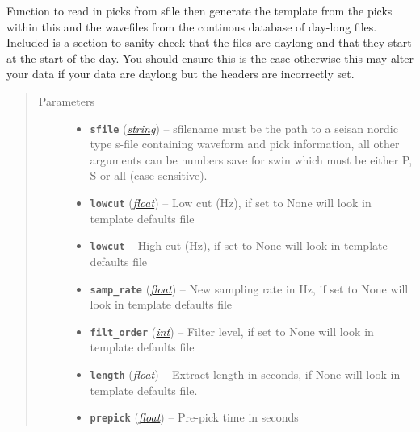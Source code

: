 \documentclass[a4paper,10pt,english]{sphinxmanual}
\begin{document}

\begin{fulllineitems}
\label{core:template_gen.from_contbase}
Function to read in picks from sfile then generate the template from the
picks within this and the wavefiles from the continous database of day-long
files.  Included is a section to sanity check that the files are daylong and
that they start at the start of the day.  You should ensure this is the case
otherwise this may alter your data if your data are daylong but the headers
are incorrectly set.
\begin{quote}\begin{description}
\item[{Parameters}] \leavevmode\begin{itemize}
\item {} 
\textbf{\texttt{sfile}} (\href{https://docs.python.org/library/string.html\#module-string}{\emph{string}}) -- sfilename must be the path to a seisan nordic type s-file             containing waveform and pick information, all other arguments can             be numbers save for swin which must be either P, S or all             (case-sensitive).

\item {} 
\textbf{\texttt{lowcut}} (\href{https://docs.python.org/library/functions.html\#float}{\emph{float}}) -- Low cut (Hz), if set to None will look in template            defaults file

\item {} 
\textbf{\texttt{lowcut}} -- High cut (Hz), if set to None will look in template            defaults file

\item {} 
\textbf{\texttt{samp\_rate}} (\href{https://docs.python.org/library/functions.html\#float}{\emph{float}}) -- New sampling rate in Hz, if set to None will look in            template defaults file

\item {} 
\textbf{\texttt{filt\_order}} (\href{https://docs.python.org/library/functions.html\#int}{\emph{int}}) -- Filter level, if set to None will look in            template defaults file

\item {} 
\textbf{\texttt{length}} (\href{https://docs.python.org/library/functions.html\#float}{\emph{float}}) -- Extract length in seconds, if None will look in template            defaults file.

\item {} 
\textbf{\texttt{prepick}} (\href{https://docs.python.org/library/functions.html\#float}{\emph{float}}) -- Pre-pick time in seconds

\end{itemize}

\end{description}\end{quote}

\end{fulllineitems}
\end{document}
